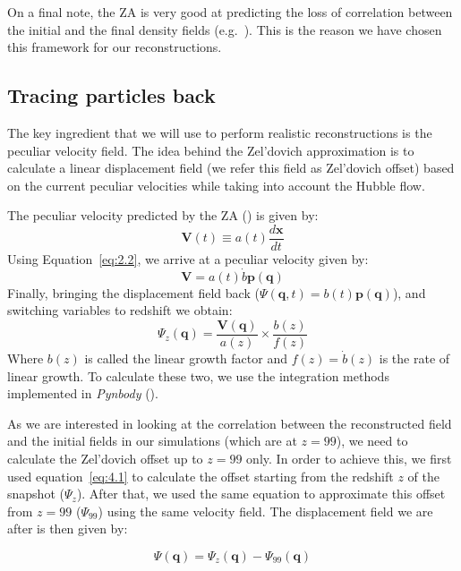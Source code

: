 On a final note, the ZA is very good at predicting the loss of correlation between the initial and the final density fields (e.g.~\cite{Pontzen_paired_simulations}). This is the reason we have chosen this framework for our reconstructions.


\subsection{Tracing particles back}

The key ingredient that we will use to perform realistic reconstructions is the peculiar velocity field. The idea behind the Zel'dovich approximation is to calculate a linear displacement field (we refer this field as Zel'dovich offset) based on the current peculiar velocities while taking into account the Hubble flow. 

The peculiar velocity predicted by the ZA (\cite{1993sfu..book.....P}) is given by:
\begin{equation}
    \textbf{V}(t) \equiv a(t)\frac{d\textbf{x}}{dt}    
\end{equation}
Using Equation~\ref{eq:2.2}, we arrive at a peculiar velocity given by:
\begin{equation}
    \textbf{V} = a(t)\dot{b}\textbf{p}(\textbf{q})
\end{equation}
Finally, bringing the displacement field back ($\Psi(\textbf{q},t) = b(t) \textbf{p}(\textbf{q})$), and switching variables to redshift we obtain:
\begin{equation}
    \Psi_z(\textbf{q}) = \frac{\textbf{V}(\textbf{q})}{a(z)} \times \frac{b(z)}{f(z)}
    \label{eq:4.1}
\end{equation} 
Where $b(z)$ is called the linear growth factor and $f(z) = \dot{b}(z)$ is the rate of linear growth. To calculate these two, we use the integration methods implemented in \textit{Pynbody} (\cite{2013ascl.soft05002P}).

As we are interested in looking at the correlation between the reconstructed field  and the initial fields in our simulations (which are at $z=99$), we need to calculate the Zel'dovich offset up to $z=99$ only. In order to achieve this, we first used equation~\ref{eq:4.1} to calculate the offset starting from the redshift $z$ of the snapshot ($\Psi_z$). After that, we used the same equation to approximate this offset from $z=99$ ($\Psi_{99}$) using the same velocity field. The displacement field we are after is then given by:

\begin{equation}
    \Psi(\textbf{q}) = \Psi_z(\textbf{q}) - \Psi_{99}(\textbf{q})
    \label{eq:4.2}
\end{equation}


